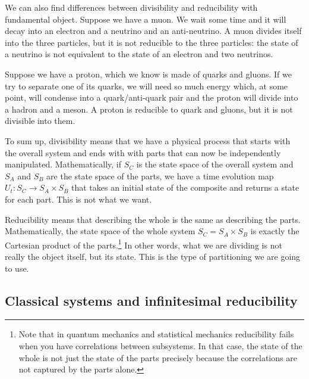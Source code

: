 We can also find differences between divisibility and reducibility with fundamental object. Suppose we have a muon. We wait some time and it will decay into an electron and a neutrino and an anti-neutrino. A muon divides itself into the three particles, but it is not reducible to the three particles: the state of a neutrino is not equivalent to the state of an electron and two neutrinos.

Suppose we have a proton, which we know is made of quarks and gluons. If we try to separate one of its quarks, we will need so much energy which, at some point, will condense into a quark/anti-quark pair and the proton will divide into a hadron and a meson. A proton is reducible to quark and gluons, but it is not divisible into them.

To sum up, divisibility means that we have a physical process that starts with the overall system and ends with with parts that can now be independently manipulated. Mathematically, if $S_C$ is the state space of the overall system and $S_A$ and $S_B$ are the state space of the parts, we have a time evolution map $U_t : S_C \to S_A \times S_B$ that takes an initial state of the composite and returns a state for each part. This is not what we want.

Reducibility means that describing the whole is the same as describing the parts. Mathematically, the state space of the whole system $S_C = S_A \times S_B$ is exactly the Cartesian product of the parts.\footnote{Note that in quantum mechanics and statistical mechanics reducibility fails when you have correlations between subsystems. In that case, the state of the whole is not just the state of the parts precisely because the correlations are not captured by the parts alone.} In other words, what we are dividing is not really the object itself, but its state. This is the type of partitioning we are going to use.

\subsection{Classical systems and infinitesimal reducibility}


